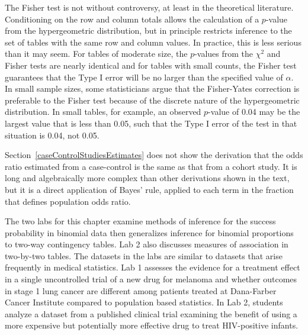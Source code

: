 The Fisher test is not without controversy, at least in the theoretical literature.  Conditioning on the row and column totals allows the calculation of a $p$-value from the hypergeometric distribution, but in principle restricts inference to the set of tables with the same row and column values.  In practice, this is less serious than it may seem. For tables of moderate size, the $p$-values from the $\chi^2$ and Fisher tests are nearly identical and for tables with small counts, the Fisher test guarantees that the Type I error will be no larger than the specified value of $\alpha$.   In small sample sizes, some statisticians argue that the Fisher-Yates correction is preferable to the Fisher test because of the discrete nature of the hypergeometric distribution.  In small tables, for example, an observed $p$-value of 0.04 may be the largest value that is less than 0.05, such that the Type I error of the test in that situation is 0.04, not 0.05.

Section~\ref{caseControlStudiesEstimates} does not show the derivation that the odds ratio estimated from a case-control is the same as that from a cohort study. It is long and algebraically more complex than other derivations shown in the text, but it is a direct application of Bayes' rule, applied to each term in the fraction that defines population odds ratio.

The two labs for this chapter examine methods of inference for the success probability in binomial data then generalizes inference for binomial proportions to two-way contingency tables.  Lab 2 also discusses measures of association in two-by-two tables.  The datasets in the labs are similar to datasets that arise frequently in medical statistics.  Lab 1 assesses the evidence for a treatment effect in a single uncontrolled trial of a new drug for melanoma and whether outcomes in stage 1 lung cancer are different among patients treated at Dana-Farber Cancer Institute compared to population based statistics. In Lab 2, students analyze a dataset from a published clinical trial examining the benefit of using a more expensive but potentially more effective drug to treat HIV-positive infants.


